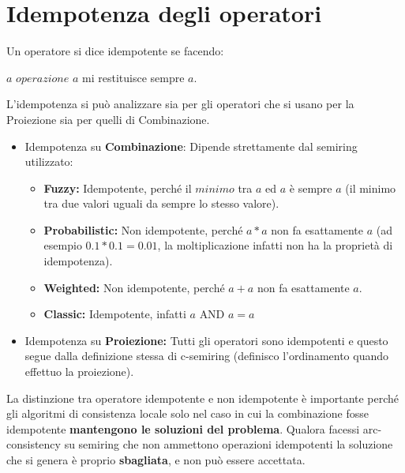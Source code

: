 \section{Idempotenza degli operatori}
Un operatore si dice idempotente se facendo:
\begin{center}
    $a$ $operazione$ $a$ mi restituisce sempre $a$.
\end{center}
L'idempotenza si può analizzare sia per gli operatori che si usano per la
Proiezione sia per quelli di Combinazione.\\
\begin{itemize}
    \item Idempotenza su \textbf{Combinazione}: Dipende strettamente dal
          semiring utilizzato:
          \begin{itemize}
              \item \textbf{Fuzzy:} Idempotente, perché il $minimo$ tra $a$ ed $a$ è
                    sempre $a$ (il minimo tra due valori uguali da sempre lo stesso
                    valore).
              \item \textbf{Probabilistic:} Non idempotente, perché $a * a$ non
                    fa esattamente $a$ (ad esempio $0.1 * 0.1 = 0.01$, la
                    moltiplicazione infatti non ha la proprietà di idempotenza).
              \item \textbf{Weighted:} Non idempotente, perché  $a + a$ non fa
                    esattamente $a$.
              \item \textbf{Classic:} Idempotente, infatti $a \text{ AND } a = a$
          \end{itemize}
    \item Idempotenza su \textbf{Proiezione:} Tutti gli operatori sono
          idempotenti e questo segue dalla definizione stessa di c-semiring (definisco
          l'ordinamento quando effettuo la proiezione).
\end{itemize}
La distinzione tra operatore idempotente e non idempotente è importante perché
gli algoritmi di consistenza locale solo nel caso in cui la combinazione fosse
idempotente \textbf{mantengono le soluzioni del problema}. Qualora facessi
arc-consistency su semiring che non ammettono operazioni idempotenti la
soluzione che si genera è proprio \textbf{sbagliata}, e non può essere
accettata.
\vspace{1cm}

